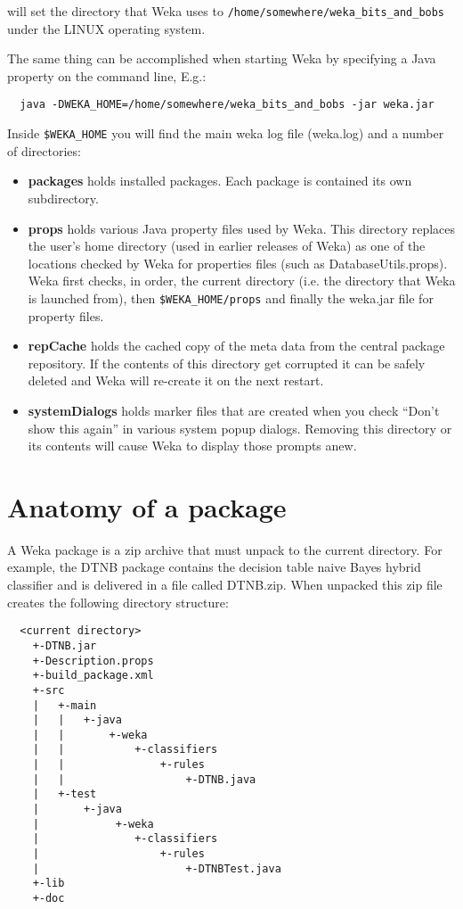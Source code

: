 will set the directory that Weka uses to
\verb=/home/somewhere/weka_bits_and_bobs= under the
LINUX operating system.

The same thing can be accomplished when starting Weka by
specifying a Java property on the command line, E.g.:

{\scriptsize
\begin{verbatim}
  java -DWEKA_HOME=/home/somewhere/weka_bits_and_bobs -jar weka.jar
\end{verbatim}}

Inside \verb=$WEKA_HOME= you will find the main weka log file (weka.log)
and a number of directories:

\begin{itemize}
\item \textbf{packages} holds installed packages. Each package is
  contained its own subdirectory.
\item \textbf{props} holds various Java property files used by
  Weka. This directory replaces the user's home directory (used in
  earlier releases of Weka) as one of the locations checked by Weka
  for properties files (such as DatabaseUtils.props). Weka first
  checks, in order, the current directory (i.e. the directory that
  Weka is launched from), then \verb=$WEKA_HOME/props= and finally the
  weka.jar file for property files.
\item \textbf{repCache} holds the cached copy of the meta data from
  the central package repository. If the contents of this directory
  get corrupted it can be safely deleted and Weka will re-create it on
  the next restart.
\item \textbf{systemDialogs} holds marker files that are created when
  you check ``Don't show this again'' in various system popup
  dialogs. Removing this directory or its contents will cause Weka to
  display those prompts anew.
\end{itemize}

\section{Anatomy of a package}

A Weka package is a zip archive that must unpack to the current
directory. For example, the DTNB package contains the decision table
naive Bayes hybrid classifier and is delivered in a file called
DTNB.zip. When unpacked this zip file creates the following directory
structure:

{\scriptsize
\begin{verbatim}
  <current directory>
    +-DTNB.jar
    +-Description.props
    +-build_package.xml
    +-src
    |   +-main
    |   |   +-java
    |   |       +-weka
    |   |           +-classifiers
    |   |               +-rules
    |   |                   +-DTNB.java
    |   +-test
    |       +-java
    |            +-weka
    |               +-classifiers
    |                   +-rules
    |                       +-DTNBTest.java
    +-lib
    +-doc
\end{verbatim}}

